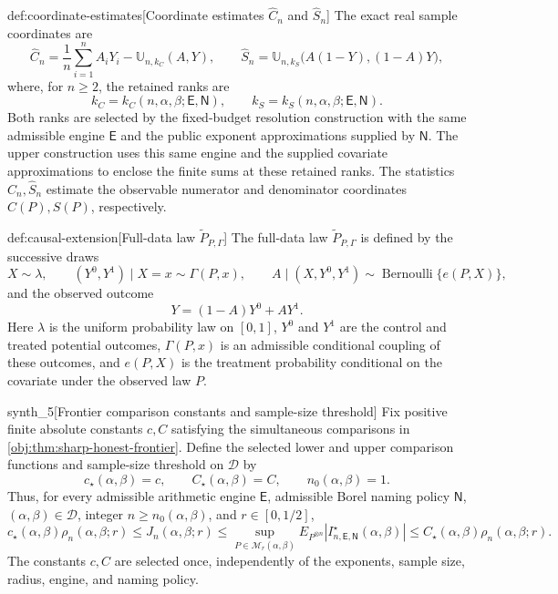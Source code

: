 \begin{definitionv}{def:coordinate-estimates}[Coordinate estimates $\widehat C_n$ and $\widehat S_n$]
The exact real sample coordinates are
\[
\widehat C_n
=\frac1n\sum_{i=1}^n A_iY_i-\mathbb U_{n,k_C}(A,Y),\qquad
\widehat S_n
=\mathbb U_{n,k_S}\bigl(A(1-Y),(1-A)Y\bigr),
\]
where, for \(n\ge2\), the retained ranks are
\[
k_C=k_C(n,\alpha,\beta;\mathsf E,\mathsf N),\qquad
k_S=k_S(n,\alpha,\beta;\mathsf E,\mathsf N).
\]
Both ranks are selected by the fixed-budget resolution construction with the same admissible engine \(\mathsf E\) and the public exponent approximations supplied by \(\mathsf N\). The upper construction uses this same engine and the supplied covariate approximations to enclose the finite sums at these retained ranks. The statistics \(\widehat C_n,\widehat S_n\) estimate the observable numerator and denominator coordinates \(C(P),S(P)\), respectively.
\end{definitionv}

\begin{definitionv}{def:causal-extension}[Full-data law $\widetilde P_{P,\Gamma}$]
The full-data law \(\widetilde P_{P,\Gamma}\) is defined by the successive draws
\[
X\sim\lambda,\qquad
(Y^0,Y^1)\mid X=x\sim\Gamma(P,x),\qquad
A\mid(X,Y^0,Y^1)\sim\operatorname{Bernoulli}\{e(P,X)\},
\]
and the observed outcome
\[
Y=(1-A)Y^0+AY^1.
\]
Here \(\lambda\) is the uniform probability law on \([0,1]\), \(Y^0\) and \(Y^1\) are the control and treated potential outcomes, \(\Gamma(P,x)\) is an admissible conditional coupling of these outcomes, and \(e(P,X)\) is the treatment probability conditional on the covariate under the observed law \(P\).
\end{definitionv}

\begin{definitionv}{synth_5}[Frontier comparison constants and sample-size threshold]
Fix positive finite absolute constants \(c,C\) satisfying the simultaneous comparisons in \cref{obj:thm:sharp-honest-frontier}. Define the selected lower and upper comparison functions and sample-size threshold on \(\mathcal D\) by
\[
c_\star(\alpha,\beta)=c,\qquad
C_\star(\alpha,\beta)=C,\qquad
n_0(\alpha,\beta)=1.
\]
Thus, for every admissible arithmetic engine \(\mathsf E\), admissible Borel naming policy \(\mathsf N\), \((\alpha,\beta)\in\mathcal D\), integer \(n\ge n_0(\alpha,\beta)\), and \(r\in[0,1/2]\),
\[
c_\star(\alpha,\beta)\rho_n(\alpha,\beta;r)
\le J_n(\alpha,\beta;r)
\le
\sup_{P\in\mathcal M_r(\alpha,\beta)}
E_{P^{\otimes n}}\!
\left|I^\star_{n,\mathsf E,\mathsf N}(\alpha,\beta)\right|
\le C_\star(\alpha,\beta)\rho_n(\alpha,\beta;r).
\]
The constants \(c,C\) are selected once, independently of the exponents, sample size, radius, engine, and naming policy.
\end{definitionv}

